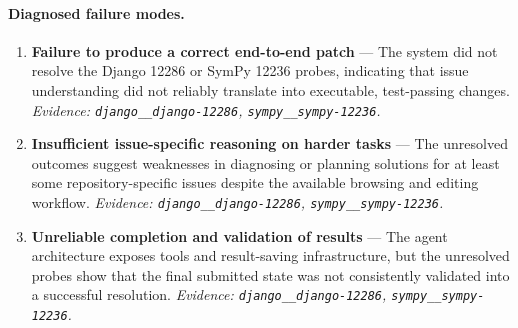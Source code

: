 \paragraph{Diagnosed failure modes.}\begin{enumerate}\itemsep1pt
\item \textbf{Failure to produce a correct end-to-end patch} --- The system did not resolve the Django 12286 or SymPy 12236 probes, indicating that issue understanding did not reliably translate into executable, test-passing changes. \emph{Evidence: \texttt{django\_\_django-12286}, \texttt{sympy\_\_sympy-12236}.}
\item \textbf{Insufficient issue-specific reasoning on harder tasks} --- The unresolved outcomes suggest weaknesses in diagnosing or planning solutions for at least some repository-specific issues despite the available browsing and editing workflow. \emph{Evidence: \texttt{django\_\_django-12286}, \texttt{sympy\_\_sympy-12236}.}
\item \textbf{Unreliable completion and validation of results} --- The agent architecture exposes tools and result-saving infrastructure, but the unresolved probes show that the final submitted state was not consistently validated into a successful resolution. \emph{Evidence: \texttt{django\_\_django-12286}, \texttt{sympy\_\_sympy-12236}.}
\end{enumerate}
